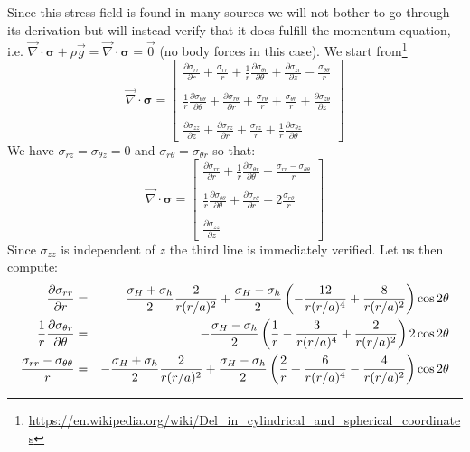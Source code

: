 Since this stress field is found in many sources we will not bother to 
go through its derivation but will instead verify that it does fulfill the 
momentum equation, i.e. $\vec\nabla \cdot {\bm \sigma} + \rho \vec{g}
= \vec\nabla \cdot {\bm \sigma}  = \vec{0}$ (no body forces in this case). We start 
from\footnote{\url{https://en.wikipedia.org/wiki/Del_in_cylindrical_and_spherical_coordinates}}  
\[
\vec\nabla \cdot {\bm \sigma} 
= 
\begin{bmatrix} 
\frac{\partial \sigma_{rr}}{\partial r} 
+ \frac{\sigma_{rr}}{r} 
+ \frac{1}{r} \frac{\partial \sigma_{\theta r}}{\partial \theta} 
+ \frac{\partial \sigma_{zr}}{\partial z} 
- \frac{\sigma_{\theta \theta}}{r} 
\\ \\
\frac{1}{r} \frac{\partial \sigma_{\theta \theta}}{\partial \theta} 
+ \frac{\partial \sigma_{r \theta}}{\partial r} 
+ \frac{\sigma_{r \theta}}{r} + \frac{\sigma_{\theta r}}{r} 
+ \frac{\partial \sigma_{z \theta}}{\partial z}
\\ \\
\frac{\partial \sigma_{z z}}{\partial z} + \frac{\partial \sigma_{r z}}{\partial r} 
+ \frac{\sigma_{rz}}{r} 
+ \frac{1}{r}\frac{\partial \sigma_{\theta z}}{\partial \theta}
\end{bmatrix}
\]
We have $\sigma_{rz}=\sigma_{\theta z}=0$ and $\sigma_{r\theta}=\sigma_{\theta r}$ so that:
\[
\vec\nabla \cdot {\bm \sigma} 
= 
\begin{bmatrix} 
\frac{\partial \sigma_{rr}}{\partial r} 
+ \frac{1}{r} \frac{\partial \sigma_{\theta r}}{\partial \theta} 
+ \frac{\sigma_{rr}-\sigma_{\theta \theta}}{r} 
\\ \\
\frac{1}{r} \frac{\partial \sigma_{\theta \theta}}{\partial \theta} 
+ \frac{\partial \sigma_{r \theta}}{\partial r} 
+ 2\frac{\sigma_{r \theta}}{r}  
\\ \\
\frac{\partial \sigma_{z z}}{\partial z}
\end{bmatrix}
\]
Since $\sigma_{zz}$ is independent of $z$ the third line is immediately verified.
Let us then compute:
\begin{eqnarray}
\frac{\partial \sigma_{rr}}{\partial r} 
&=& 
\frac{\sigma_H+\sigma_h}{2}\frac{2}{r (r/a)^2} 
+ \frac{\sigma_H-\sigma_h}{2}  \left( - \frac{12 }{r(r/a)^4} + \frac{8}{r(r/a)^2}   \right) \cos 2\theta 
\nonumber\\
\frac{1}{r} \frac{\partial \sigma_{\theta r}}{\partial \theta} 
&=& 
- \frac{\sigma_H-\sigma_h}{2} \left( \frac1r -  \frac{3}{r(r/a)^4} + \frac{2}{r(r/a)^2} \right) 2 \cos 2\theta
\nonumber\\
\frac{\sigma_{rr}-\sigma_{\theta \theta}}{r} 
&=& 
-\frac{\sigma_H+\sigma_h}{2}  \frac{2}{r(r/a)^2} + 
\frac{\sigma_H-\sigma_h}{2}  \left( \frac2r+  \frac{6}{r(r/a)^4} -\frac{4}{r(r/a)^2}\right) \cos 2\theta  
\nonumber
\end{eqnarray}
